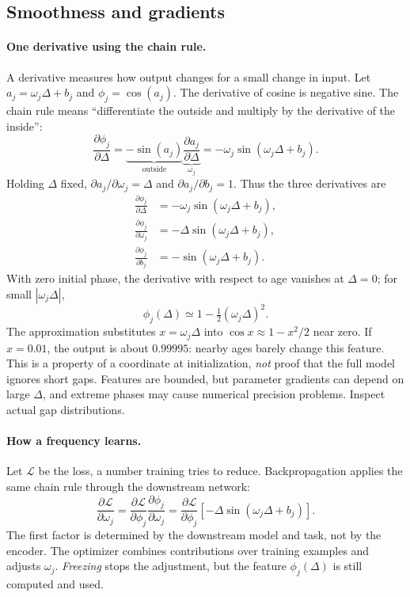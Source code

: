\documentclass[11pt]{article}
\begin{document}
\subsection{Smoothness and gradients}
\paragraph{One derivative using the chain rule.}
A derivative measures how output changes for a small change in input. Let $a_j=\omega_j\Delta+b_j$ and $\phi_j=\cos(a_j)$. The derivative of cosine is negative sine. The chain rule means ``differentiate the outside and multiply by the derivative of the inside'':
\begin{equation}
\frac{\partial\phi_j}{\partial\Delta}
=\underbrace{-\sin(a_j)}_{\text{outside}}
\underbrace{\frac{\partial a_j}{\partial\Delta}}_{\omega_j}
=-\omega_j\sin(\omega_j\Delta+b_j).
\end{equation}
Holding $\Delta$ fixed, $\partial a_j/\partial\omega_j=\Delta$ and $\partial a_j/\partial b_j=1$. Thus the three derivatives are
\begin{align}
\frac{\partial\phi_j}{\partial\Delta}
  &=-\omega_j\sin(\omega_j\Delta+b_j),\\
\frac{\partial\phi_j}{\partial\omega_j}
  &=-\Delta\sin(\omega_j\Delta+b_j),\\
\frac{\partial\phi_j}{\partial b_j}
  &=-\sin(\omega_j\Delta+b_j).
\end{align}
With zero initial phase, the derivative with respect to age vanishes at $\Delta=0$; for small $|\omega_j\Delta|$,
\begin{equation}
\phi_j(\Delta)\simeq1-\tfrac12(\omega_j\Delta)^2.
\end{equation}
The approximation substitutes $x=\omega_j\Delta$ into $\cos x\approx1-x^2/2$ near zero. If $x=0.01$, the output is about $0.99995$: nearby ages barely change this feature. This is a property of a coordinate at initialization, \emph{not} proof that the full model ignores short gaps. Features are bounded, but parameter gradients can depend on large $\Delta$, and extreme phases may cause numerical precision problems. Inspect actual gap distributions.

\paragraph{How a frequency learns.}
Let $\mathcal L$ be the loss, a number training tries to reduce. Backpropagation applies the same chain rule through the downstream network:
\begin{equation}
\frac{\partial\mathcal L}{\partial\omega_j}
=\frac{\partial\mathcal L}{\partial\phi_j}
\frac{\partial\phi_j}{\partial\omega_j}
=\frac{\partial\mathcal L}{\partial\phi_j}
[-\Delta\sin(\omega_j\Delta+b_j)].
\end{equation}
The first factor is determined by the downstream model and task, not by the encoder. The optimizer combines contributions over training examples and adjusts $\omega_j$. \emph{Freezing} stops the adjustment, but the feature $\phi_j(\Delta)$ is still computed and used.
\end{document}

